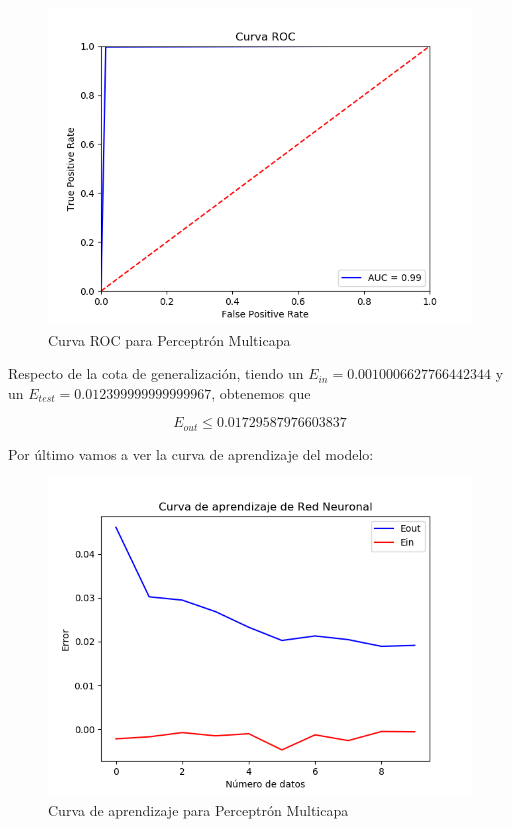 \begin{figure}[H] %
	\centering
	\includegraphics[scale=0.6]{ROC-NEURONAL.png}  %
	\caption{Curva ROC para Perceptrón Multicapa} 
	\label{fig:roc-pmc}
\end{figure}

Respecto de la cota de generalización, tiendo un $E_{in}=0.0010006627766442344 $ y un $E_{test} =0.012399999999999967 $, obtenemos que

$$E_{out} \leq 0.01729587976603837$$

Por último vamos a ver la curva de aprendizaje del modelo:

\begin{figure}[H] %
	\centering
	\includegraphics[scale=0.6]{aprendizaje-red-neuronal.png}  %
	\caption{Curva de aprendizaje para Perceptrón Multicapa} 
	\label{fig:aprendizaje-perceptron-multicapa}
\end{figure}

